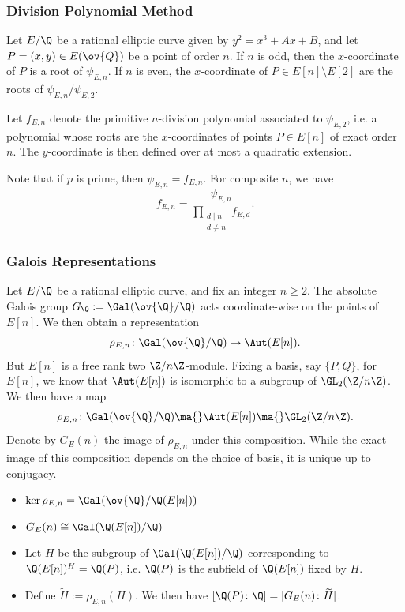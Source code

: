 \begin{frame}[plain] \frametitle{Division Polynomial Method}
Let $E/\Q$ be a rational elliptic curve given by $y^2= x^3 + Ax + B$, and let $P= (x,y) \in E(\ov{Q})$ be a point of order $n$. If $n$ is odd, then the $x$-coordinate of $P$ is a root of $\psi_{E,n}$. If $n$ is even, the $x$-coordinate of $P \in E[n] \setminus E[2]$ are the roots of $\psi_{E,n}/\psi_{E,2}$. \pspace

Let $f_{E,n}$ denote the primitive $n$-division polynomial associated to $\psi_{E,2}$, i.e. a polynomial whose roots are the $x$-coordinates of points $P \in E[n]$ of exact order $n$. The $y$-coordinate is then defined over at most a quadratic extension. \pspace

Note that if $p$ is prime, then $\psi_{E,n}= f_{E,n}$. For composite $n$, we have
	\[
	f_{E,n}= \dfrac{\psi_{E,n}}{\prod_{\substack{d \mid n \\ d \neq n}} f_{E,d}}.
	\]
\end{frame}





\begin{frame}[plain] \frametitle{Galois Representations}
\footnotesize
Let $E/\Q$ be a rational elliptic curve, and fix an integer $n \geq 2$. The absolute Galois group $G_\Q:= \Gal(\ov{\Q}/\Q)$ acts coordinate-wise on the points of $E[n]$. We then obtain a representation
	\[
	\rho_{E,n} \colon \Gal(\ov{\Q}/\Q) \to \Aut(E[n]).
	\]
But $E[n]$ is a free rank two $\Z/n\Z$-module. Fixing a basis, say $\{ P, Q \}$, for $E[n]$, we know that $\Aut(E[n])$ is isomorphic to a subgroup of $\GL_2(\Z/n\Z)$. We then have a map
	\[
	\rho_{E,n} \colon \Gal(\ov{\Q}/\Q) \ma{} \Aut(E[n]) \ma{} \GL_2(\Z/n\Z).
	\]
Denote by $G_E(n)$ the image of $\rho_{E,n}$ under this composition. While the exact image of this composition depends on the choice of basis, it is unique up to conjugacy. 

\begin{itemize}
\item $\ker \rho_{E,n}= \Gal(\ov{\Q}/\Q(E[n]))$
\item $G_E(n) \cong \Gal(\Q(E[n])/\Q)$
\item Let $H$ be the subgroup of $\Gal(\Q(E[n])/\Q)$ corresponding to $\Q(E[n])^H= \Q(P)$, i.e. $\Q(P)$ is the subfield of $\Q(E[n])$ fixed by $H$. 
\item Define $\widetilde{H}:= \rho_{E,n}(H)$. We then have $[\Q(P) \colon \Q]= |G_E(n) \colon \widetilde{H}|$. 
\end{itemize}
\end{frame}





